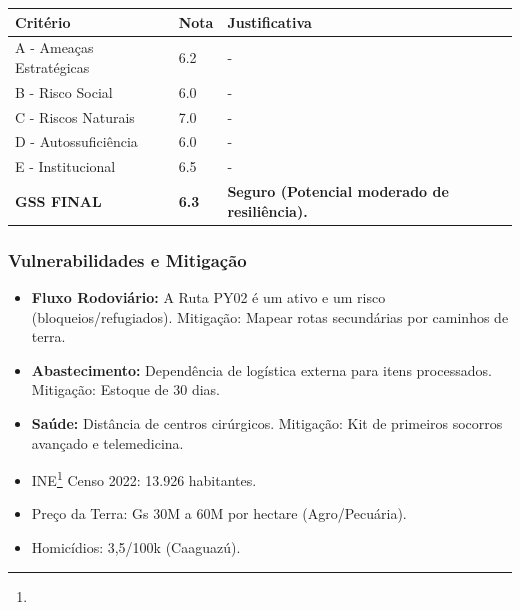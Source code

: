 \begin{table}[ht!]
\small \begin{tabular}{p{3.0cm}p{0.8cm}p{6.0cm}} \toprule
\textbf{Critério} & \textbf{Nota} & \textbf{Justificativa} \\ \midrule
A - Ameaças Estratégicas & 6.2 & - \\
B - Risco Social & 6.0 & - \\
C - Riscos Naturais & 7.0 & - \\
D - Autossuficiência & 6.0 & - \\
E - Institucional & 6.5 & - \\
\midrule \textbf{GSS FINAL} & \textbf{6.3} & \textbf{Seguro (Potencial moderado de resiliência).} \\ \bottomrule \end{tabular}
\end{table}
\subsubsection{Vulnerabilidades e
Mitigação}

\begin{itemize}
\item
  \textbf{Fluxo Rodoviário:} A Ruta PY02 é um ativo e um risco
  (bloqueios/\allowbreak refugiados). Mitigação: Mapear rotas secundárias por
  caminhos de terra.
\item
  \textbf{Abastecimento:} Dependência de logística externa para itens
  processados. Mitigação: Estoque de 30 dias.
\item
  \textbf{Saúde:} Distância de centros cirúrgicos. Mitigação: Kit de
  primeiros socorros avançado e telemedicina.
\item
  INE\footnote{\fineINE} Censo 2022: 13.926 habitantes.
\item
  Preço da Terra: Gs 30M a 60M por hectare (Agro/\allowbreak Pecuária).
\item
  Homicídios: 3,5/\allowbreak 100k (Caaguazú).
\end{itemize}
